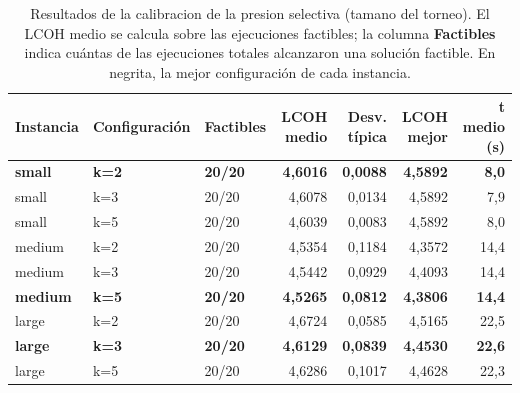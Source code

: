 \begin{table}[H]
    \centering
    \small
    \renewcommand{\arraystretch}{1.25}
    \begin{tabular}{lllrrrr}
        \hline
        \textbf{Instancia} & \textbf{Configuración} & \textbf{Factibles} & \textbf{LCOH medio} & \textbf{Desv. típica} & \textbf{LCOH mejor} & \textbf{t medio (s)} \\
        \hline
        \textbf{small} & \textbf{k=2} & \textbf{20/20} & \textbf{4,6016} & \textbf{0,0088} & \textbf{4,5892} & \textbf{8,0} \\
        small & k=3 & 20/20 & 4,6078 & 0,0134 & 4,5892 & 7,9 \\
        small & k=5 & 20/20 & 4,6039 & 0,0083 & 4,5892 & 8,0 \\
        \hline
        medium & k=2 & 20/20 & 4,5354 & 0,1184 & 4,3572 & 14,4 \\
        medium & k=3 & 20/20 & 4,5442 & 0,0929 & 4,4093 & 14,4 \\
        \textbf{medium} & \textbf{k=5} & \textbf{20/20} & \textbf{4,5265} & \textbf{0,0812} & \textbf{4,3806} & \textbf{14,4} \\
        \hline
        large & k=2 & 20/20 & 4,6724 & 0,0585 & 4,5165 & 22,5 \\
        \textbf{large} & \textbf{k=3} & \textbf{20/20} & \textbf{4,6129} & \textbf{0,0839} & \textbf{4,4530} & \textbf{22,6} \\
        large & k=5 & 20/20 & 4,6286 & 0,1017 & 4,4628 & 22,3 \\
        \hline
    \end{tabular}
    \caption{Resultados de la calibracion de la presion selectiva (tamano del torneo). El LCOH medio se calcula sobre las ejecuciones factibles; la columna \textbf{Factibles} indica cuántas de las ejecuciones totales alcanzaron una solución factible. En negrita, la mejor configuración de cada instancia.}
    \label{tab:calib_e07_torneo}
\end{table}

